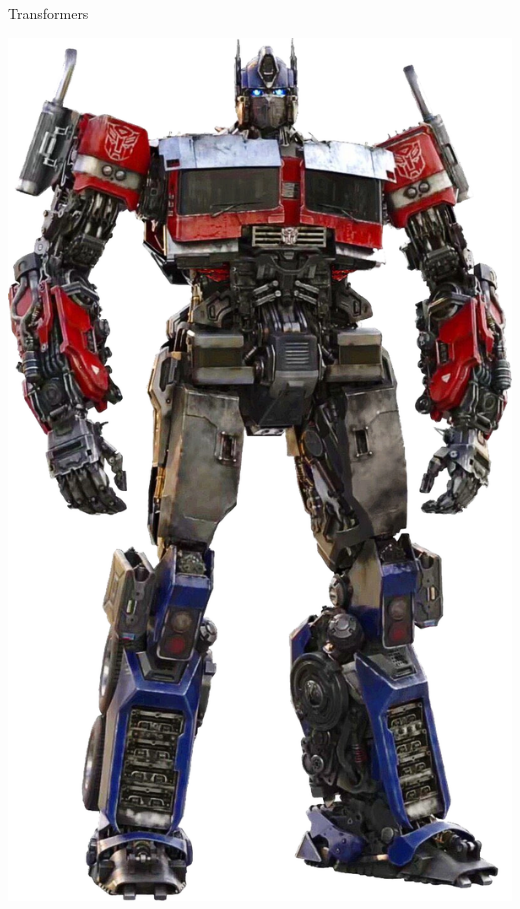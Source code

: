\documentclass{beamer}
\begin{document}
\begin{frame}[fragile]{Transformers}
    \begin{center}
        \includegraphics[width=\textwidth,height=0.8\textheight,keepaspectratio]{figures/PrimeRenderROTB.png}
    \end{center}
\end{frame}
\end{document}
